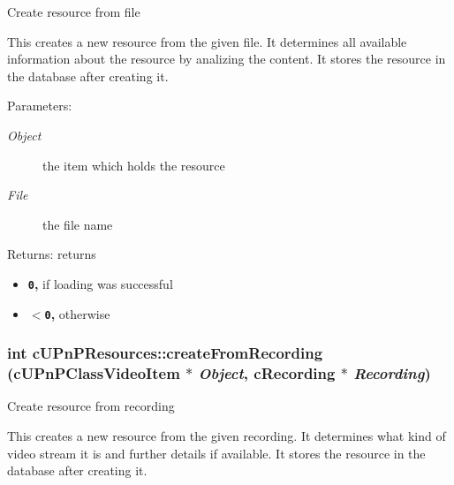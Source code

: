 Create resource from file

This creates a new resource from the given file. It determines all available information about the resource by analizing the content. It stores the resource in the database after creating it.

\begin{Desc}
\item[Parameters:]
\begin{description}
\item[{\em Object}]the item which holds the resource \item[{\em File}]the file name \end{description}
\end{Desc}
\begin{Desc}
\item[Returns:]returns\begin{itemize}
\item {\bf {\tt 0},} if loading was successful\item {\bf {\tt $<$0},} otherwise \end{itemize}
\end{Desc}
\hypertarget{classcUPnPResources_47b243391bc9e1867bc16d4307f2af8a}{
\subsubsection[{createFromRecording}]{\setlength{\rightskip}{0pt plus 5cm}int cUPnPResources::createFromRecording ({\bf cUPnPClassVideoItem} $\ast$ {\em Object}, \/  cRecording $\ast$ {\em Recording})}}
\label{classcUPnPResources_47b243391bc9e1867bc16d4307f2af8a}


Create resource from recording

This creates a new resource from the given recording. It determines what kind of video stream it is and further details if available. It stores the resource in the database after creating it.

